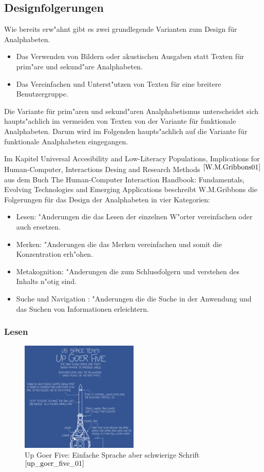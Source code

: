 \subsection{ Designfolgerungen}\label{sec:designClue}
Wie bereits erw"ahnt gibt es zwei grundlegende Varianten zum Design für Analphabeten.
\begin{itemize}
\item Das Verwenden von Bildern oder akustischen Ausgaben statt Texten für prim"are und sekund"are Analphabeten.
\item Das Vereinfachen und Unterst"utzen von Texten für eine breitere Benutzergruppe.
\end{itemize}
Die Variante für prim"aren und sekund"aren Analphabetismus unterscheidet sich haupts"achlich im vermeiden von Texten von der Variante für funktionale Analphabeten. Darum wird im Folgenden haupts"achlich auf die Variante für funktionale Analphabeten eingegangen.

Im Kapitel \glqq Universal Accesibility and Low-Literacy Populations, Implications for Human-Computer, Interactions Desing and Research Methods \grqq$^{\ref{W.M.Gribbons01}}$ aus dem Buch \glqq The Human-Computer Interaction Handbook: Fundamentals, Evolving Technologies and Emerging Applications \grqq beschreibt W.M.Gribbons die Folgerungen für das Design der Analphabeten in vier Kategorien:\\

\begin{itemize}
\item Lesen:              "Anderungen die das Lesen der einzelnen W"orter vereinfachen oder auch ersetzen.
\item Merken:            "Anderungen die das Merken vereinfachen und somit die Konzentration erh"ohen.
\item Metakognition: "Anderungen die zum Schlussfolgern und verstehen des Inhalts n"otig sind.
\item Suche und Navigation : "Anderungen die die Suche in der Anwendung und das Suchen von Informationen erleichtern.
\end{itemize}

\subsubsection{Lesen}\label{sec:designClueReading}
\begin{figure}[h]
	\centering
		\includegraphics[width=0.50\textwidth]{Daten/up_goer_five_part.png}
	\caption{Up Goer Five: Einfache Sprache aber schwierige Schrift $^{\ref{up_goer_five_01}}$}
	\label{fig:GoerFive}
\end{figure}

